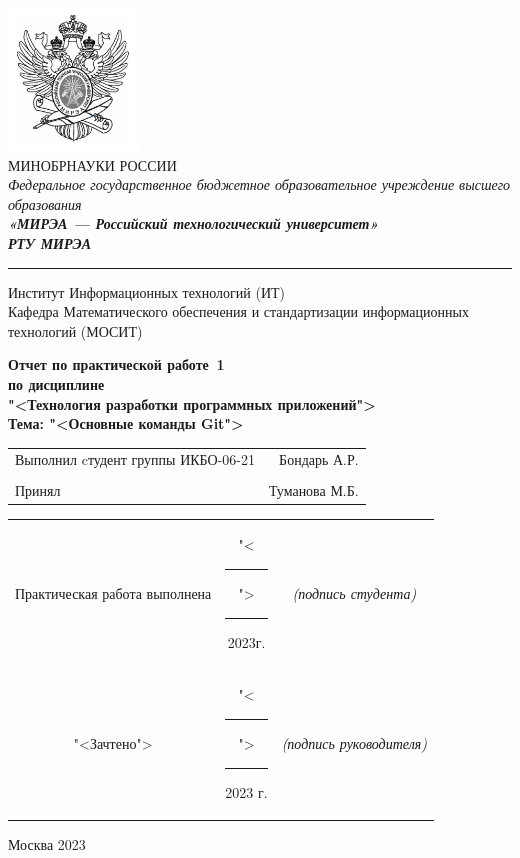 \begin{center}
	\includegraphics[scale=0.5]{./res/logo.png}\\
	\normalsize{МИНОБРНАУКИ РОССИИ}\\
	\normalsize{\itshape Федеральное государственное бюджетное образовательное учреждение высшего образования}\\
	\normalsize{\bfseries\itshape«МИРЭА --- Российский технологический университет»}\\
	\large{\bfseries\itshape РТУ МИРЭА}\\
	\bigskip \hrule \smallskip
	\normalsize{Институт Информационных технологий (ИТ)}\\
	\vfill
	\normalsize{Кафедра Математического обеспечения и стандартизации информационных технологий (МОСИТ)}\\
	\vfill
	\begin{normalsize}
	  \textbf{
	    Отчет по практической работе \No\,1\\
	    по дисциплине\\
	    "<Технология разработки программных приложений">\\
	    Тема: "<Основные команды Git">\\
	  }
	\end{normalsize}
	\vfill
	\vfill
	\begin{small}
		\begin{tabular}{lr}
			Выполнил cтудент группы ИКБО-06-21 & Бондарь А.Р.\\\\
			Принял & Туманова М.Б.\\
		\end{tabular}
	\end{small}
	\vfill
	\begin{footnotesize}
		\begin{tabular}{ccc}
			Практическая  работа выполнена
			& "<\rule{1ex}{.5pt}">\rule{7ex}{.5pt}2023г.
			& \textit{(подпись студента)}\\
			"<Зачтено"> 
			& "<\rule{1ex}{.5pt}">\rule{7ex}{.5pt}2023 г.
			& \textit{(подпись руководителя)}\\
		\end{tabular}
	\end{footnotesize}
	\vfill
\end{center}

\begin{center} Москва 2023 \end{center}

\thispagestyle{empty}
